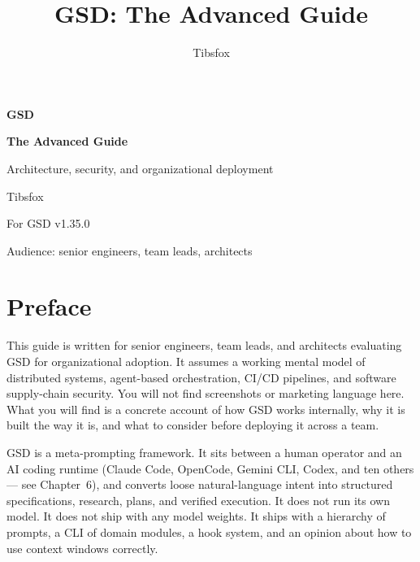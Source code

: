 \documentclass[11pt,letterpaper,openany]{book}
\title{GSD: The Advanced Guide}
\author{Tibsfox}
\date{}
\begin{document}
\begin{titlepage}
\centering
\vspace*{2cm}
{\headingfont\Huge\bfseries\color{gsdnavy} GSD\par}
\vspace{0.4cm}
{\headingfont\LARGE\bfseries\color{gsdnavy} The Advanced Guide\par}
\vspace{0.8cm}
{\headingfont\large Architecture, security, and organizational deployment\par}
\vspace{3cm}
{\large Tibsfox\par}
\vspace{0.4cm}
{\small For GSD v1.35.0 \par}
\vspace{0.4cm}
{\small Audience: senior engineers, team leads, architects \par}
\vfill
{\footnotesize \cclicense\par}
\end{titlepage}

\tableofcontents
\clearpage

\chapter*{Preface}

This guide is written for senior engineers, team leads, and architects evaluating GSD for organizational adoption. It assumes a working mental model of distributed systems, agent-based orchestration, CI/CD pipelines, and software supply-chain security. You will not find screenshots or marketing language here. What you will find is a concrete account of how GSD works internally, why it is built the way it is, and what to consider before deploying it across a team.

GSD is a meta-prompting framework. It sits between a human operator and an AI coding runtime (Claude Code, OpenCode, Gemini CLI, Codex, and ten others — see Chapter~6), and converts loose natural-language intent into structured specifications, research, plans, and verified execution. It does not run its own model. It does not ship with any model weights. It ships with a hierarchy of prompts, a CLI of domain modules, a hook system, and an opinion about how to use context windows correctly.
\end{document}
